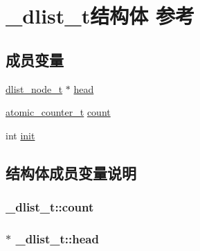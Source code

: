 \hypertarget{a00008}{}\section{\+\_\+dlist\+\_\+t结构体 参考}
\label{a00008}
\subsection*{成员变量}
\begin{DoxyCompactItemize}
\item 
\hyperlink{a00051_a62053232bcf3566010ef98a7d77c3cc8_a62053232bcf3566010ef98a7d77c3cc8}{dlist\+\_\+node\+\_\+t} $\ast$ \hyperlink{a00008_a0977afbac05b99991386bb9bd75a6fe2_a0977afbac05b99991386bb9bd75a6fe2}{head}
\item 
\hyperlink{a00051_a0d043bbb6b8db19fea54ab9271d352b6_a0d043bbb6b8db19fea54ab9271d352b6}{atomic\+\_\+counter\+\_\+t} \hyperlink{a00008_aa38de0ef086624e66baf0aa28accb45f_aa38de0ef086624e66baf0aa28accb45f}{count}
\item 
int \hyperlink{a00008_a3de2609af755cf6408f8d450b9bd7252_a3de2609af755cf6408f8d450b9bd7252}{init}
\end{DoxyCompactItemize}


\subsection{结构体成员变量说明}
\hypertarget{a00008_aa38de0ef086624e66baf0aa28accb45f_aa38de0ef086624e66baf0aa28accb45f}{}
\subsubsection[{count}]{ \+\_\+dlist\+\_\+t\+::count}\label{a00008_aa38de0ef086624e66baf0aa28accb45f_aa38de0ef086624e66baf0aa28accb45f}
\hypertarget{a00008_a0977afbac05b99991386bb9bd75a6fe2_a0977afbac05b99991386bb9bd75a6fe2}{}
\subsubsection[{head}]{$\ast$ \+\_\+dlist\+\_\+t\+::head}\label{a00008_a0977afbac05b99991386bb9bd75a6fe2_a0977afbac05b99991386bb9bd75a6fe2}
\hypertarget{a00008_a3de2609af755cf6408f8d450b9bd7252_a3de2609af755cf6408f8d450b9bd7252}{}
